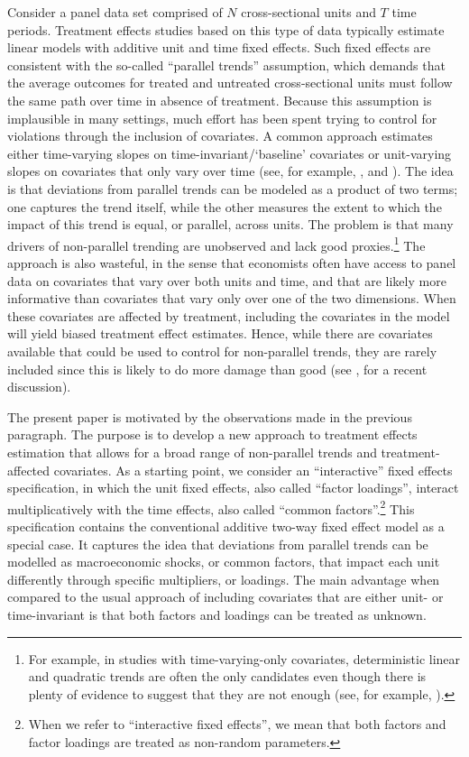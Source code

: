 \documentclass[12pt,fleqn]{article}
\begin{document}
  Consider a panel data set comprised of $N$ cross-sectional units and $T$ time periods. Treatment effects studies based on this type of data typically estimate linear models with additive unit and time fixed effects. Such fixed effects are consistent with the so-called ``parallel trends'' assumption, which demands that the average outcomes for treated and untreated cross-sectional units must follow the same path over time in absence of treatment. Because this assumption is implausible in many settings, much effort has been spent trying to control for violations through the inclusion of covariates. A common approach estimates either time-varying slopes on time-invariant/`baseline' covariates or unit-varying slopes on covariates that only vary over time (see, for example, \citealp{Callaway_Karami_2020}, and \citealp{kim_oka2014}). The idea is that deviations from parallel trends can be modeled as a product of two terms; one captures the trend itself, while the other measures the extent to which the impact of this trend is equal, or parallel, across units. The problem is that many drivers of non-parallel trending are unobserved and lack good proxies.\footnote{For example, in studies with time-varying-only covariates, deterministic linear and quadratic trends are often the only candidates even though there is plenty of evidence to suggest that they are not enough (see, for example, \citealp{kim_oka2014}).} The approach is also wasteful, in the sense that economists often have access to panel data on covariates that vary over both units and time, and that are likely more informative than covariates that vary only over one of the two dimensions. When these covariates are affected by treatment, including the covariates in the model will yield biased treatment effect estimates. Hence, while there are covariates available that could be used to control for non-parallel trends, they are rarely included since this is likely to do more damage than good (see \citealp{Caetano_Callaway_Payne_Rodrigues_2022}, for a recent discussion).
  
  The present paper is motivated by the observations made in the previous paragraph. The purpose is to develop a new approach to treatment effects estimation that allows for a broad range of non-parallel trends and treatment-affected covariates. As a starting point, we consider an ``interactive'' fixed effects specification, in which the unit fixed effects, also called ``factor loadings'', interact multiplicatively with the time effects, also called ``common factors''.\footnote{When we refer to ``interactive fixed effects'', we mean that both factors and factor loadings are treated as non-random parameters.} This specification contains the conventional additive two-way fixed effect model as a special case. It captures the idea that deviations from parallel trends can be modelled as macroeconomic shocks, or common factors, that impact each unit differently through specific multipliers, or loadings. The main advantage when compared to the usual approach of including covariates that are either unit- or time-invariant is that both factors and loadings can be treated as unknown.
  
\end{document}
